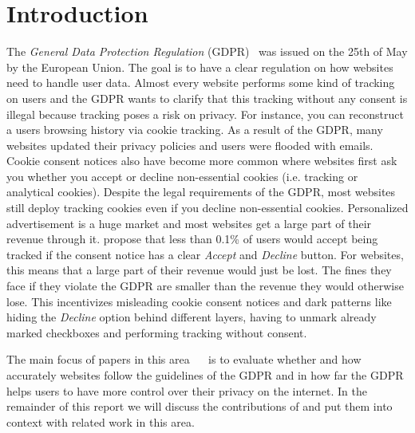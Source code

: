 \section{Introduction}
\label{sec:intro}

The \emph{General Data Protection Regulation} (GDPR)~\cite{EUdataregulations2018} was issued on the 25th of May by the European Union. The goal is to
have a clear regulation on how websites need to handle user data. Almost every website performs some kind of tracking on
users and the GDPR wants to clarify that this tracking without any consent is illegal because tracking poses a risk on
privacy. For instance, you can reconstruct a users browsing history via cookie tracking. As a result of the GDPR, many
websites updated their privacy policies and users were flooded with emails. Cookie consent notices also have become more
common where websites first ask you whether you accept or decline non-essential cookies (i.e. tracking or analytical
cookies). Despite the legal requirements of the GDPR, most websites still deploy tracking cookies even if you decline
non-essential cookies. Personalized advertisement is a huge market and most websites get a large
part of their revenue through it.  propose that less than 0.1\% of users
would accept being tracked if the consent notice has a clear \emph{Accept} and \emph{Decline} button. For websites, this
means that a large part of their revenue would just be lost. The fines they face if they violate the GDPR are smaller
than the revenue they would otherwise lose. This incentivizes misleading cookie consent notices and dark patterns like
hiding the \emph{Decline} option behind different layers, having to unmark already marked checkboxes and performing
tracking without consent.

The main focus of papers in this area \cite{degeling2018we}~\cite{trevisan20194}~\cite{nouwens2020dark}
is to evaluate whether and how accurately websites follow the guidelines of the
GDPR and in how far the GDPR helps users to have more control over their privacy on the internet.
In the remainder of this report we will discuss the contributions of  and put them into context
with related work in this area.


